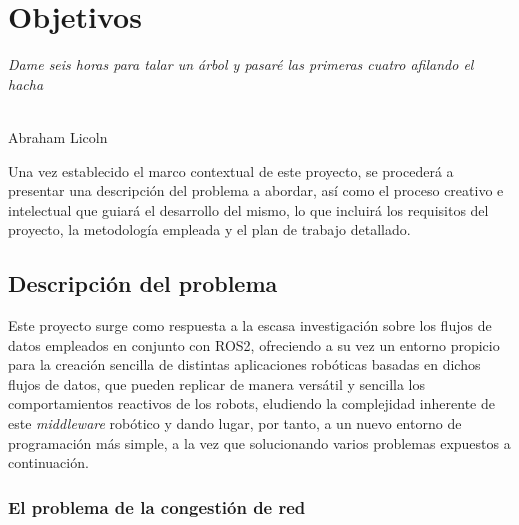 \chapter{Objetivos}
\label{cap:capitulo2}

\begin{flushright}
\begin{minipage}[]{10cm}
\emph{Dame seis horas para talar un árbol y pasaré las primeras cuatro afilando el hacha}\\
\end{minipage}\\

Abraham Licoln\\
\end{flushright}

\vspace{1cm}

Una vez establecido el marco contextual de este proyecto, se procederá a
presentar una descripción del problema a abordar, así como el proceso creativo e
intelectual que guiará el desarrollo del mismo, lo que incluirá los requisitos
del proyecto, la metodología empleada y el plan de trabajo detallado.


\section{Descripción del problema}
\label{sec:descripcion}

Este proyecto surge como respuesta a la escasa investigación sobre los
flujos de datos empleados en conjunto con ROS2, ofreciendo a su vez un entorno
propicio para la creación sencilla de distintas aplicaciones robóticas basadas
en dichos flujos de datos, que pueden replicar de manera versátil y sencilla los
comportamientos reactivos de los robots, eludiendo la complejidad inherente de
este \textit{middleware} robótico y dando lugar, por tanto, a un nuevo entorno
de programación más simple, a la vez que solucionando varios problemas expuestos
a continuación.


\subsection{El problema de la congestión de red}
\label{sec:problema_congestion}

